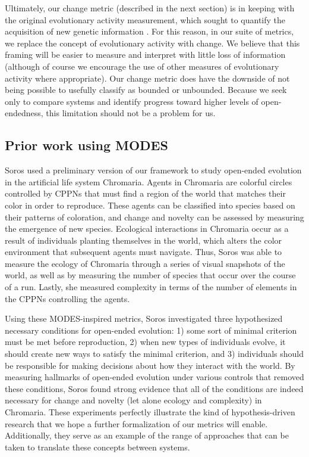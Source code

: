 \documentclass[letterpaper]{article}
\begin{document}
Ultimately, our change metric (described in the next section) is in keeping with the original evolutionary activity measurement, which sought to quantify the acquisition of new genetic information \citep{langton_measurement_1992}. For this reason, in our suite of metrics, we replace the concept of evolutionary activity with change. We believe that this framing will be easier to measure and interpret with little loss of information (although of course we encourage the use of other measures of evolutionary activity where appropriate). Our change metric does have the downside of not being possible to usefully classify as bounded or unbounded. Because we seek only to compare systems and identify progress toward higher levels of open-endedness, this limitation should not be a problem for us.


\subsection{Prior work using MODES}


Soros \cite{soros_necessary_2018} used a preliminary version of our framework \citep{dolson_whats_2015} to study open-ended evolution in the artificial life system Chromaria. Agents in Chromaria are colorful circles controlled by CPPNs that must find a region of the world that matches their color in order to reproduce. These agents can be classified into species based on their patterns of coloration, and change and novelty can be assessed by measuring the emergence of new species. Ecological interactions in Chromaria occur as a result of individuals planting themselves in the world, which alters the color environment that subsequent agents must navigate. Thus, Soros was able to measure the ecology of Chromaria through a series of visual snapshots of the world, as well as by measuring the number of species that occur over the course of a run. Lastly, she measured complexity in terms of the number of elements in the CPPNs controlling the agents. 

Using these MODES-inspired metrics, Soros \cite{soros_necessary_2018} investigated three hypothesized necessary conditions for open-ended evolution: 1) some sort of minimal criterion \citep{soros_identifying_2014} must be met before reproduction, 2) when new types of individuals evolve, it should create new ways to satisfy the minimal criterion, and 3) individuals should be responsible for making decisions about how they interact with the world. By measuring hallmarks of open-ended evolution under various controls that removed these conditions, Soros \cite{soros_necessary_2018} found strong evidence that all of the conditions are indeed necessary for change and novelty (let alone ecology and complexity) in Chromaria. These experiments perfectly illustrate the kind of hypothesis-driven research that we hope a further formalization of our metrics will enable. Additionally, they serve as an example of the range of approaches that can be taken to translate these concepts between systems. 
\end{document}
